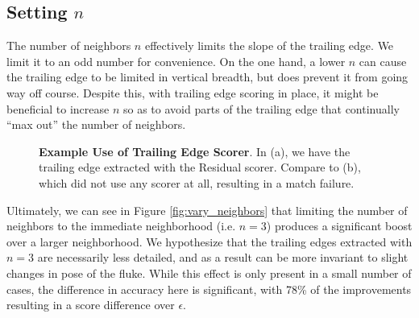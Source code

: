\subsection{Setting $n$}

The number of neighbors $n$ effectively limits the slope of the trailing edge.
We limit it to an odd number for convenience.
On the one hand, a lower $n$ can cause the trailing edge to be limited in vertical breadth, but does prevent it from going way off course.
Despite this, with trailing edge scoring in place, it might be beneficial to increase $n$ so as to avoid parts of the trailing edge that continually ``max out'' the number of neighbors.

\begin{figure}[t]%
\centering
{}
\newline
{}
\caption{\textbf{Example Use of Trailing Edge Scorer}. In (a), we have the trailing edge extracted with the Residual scorer. Compare to (b), which did not use any scorer at all, resulting in a match failure.}
\label{fig:dis_te_use}
\end{figure}

Ultimately, we can see in Figure \ref{fig:vary_neighbors} that limiting the number of neighbors to the immediate neighborhood (i.e. $n = 3$) produces a significant boost over a larger neighborhood.
We hypothesize that the trailing edges extracted with $n = 3$ are necessarily less detailed, and as a result can be more invariant to slight changes in pose of the fluke.
While this effect is only present in a small number of cases, the difference in accuracy here is significant, with 78\% of the improvements resulting in a score difference over $\epsilon$.

